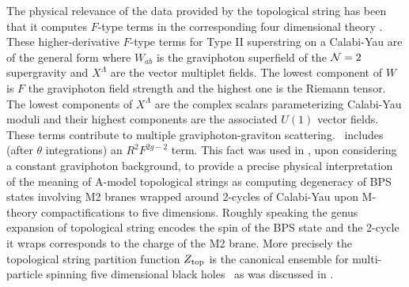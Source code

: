 The physical relevance of the data provided  by the
topological string has been that it computes $F$-type terms
in the corresponding four dimensional theory .
These
higher-derivative $F$-type terms for Type II superstring
on a Calabi-Yau are of
the general form
%
 \eqn{}
%
where ${ W}_{ab}$ is the graviphoton superfield of the ${\cal
N}=2$ supergravity and $X^\Lambda$ are the vector multiplet
fields.  The lowest component of ${ W}$ is $F$ the graviphoton
field strength and the highest one is the Riemann tensor. The
lowest components of $X^\Lambda$ are the complex scalars
parameterizing Calabi-Yau moduli and their highest components are
the associated $U(1)$ vector fields. These terms contribute to
multiple graviphoton-graviton scattering.  \tyu\ includes (after
$\theta $ integrations)
 an $R^2 F^{2g-2}$ term.  This fact was used in \gova , upon
considering a constant graviphoton background, to provide a
precise physical interpretation of the meaning of A-model
topological strings as computing degeneracy of BPS states
involving M2 branes wrapped around 2-cycles of Calabi-Yau upon
M-theory compactifications to five dimensions. Roughly speaking
the genus expansion of topological string encodes the spin of the
BPS state and the 2-cycle it wraps corresponds to the charge of
the M2 brane.  More precisely the topological string
partition function $Z_{\rm top}$ is the canonical ensemble
for multi-particle spinning five dimensional black holes
\petal\ as was discussed in \kkv .


